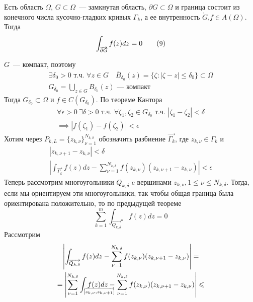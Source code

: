 \documentclass[main]{subfiles}
\begin{document}
\begin{theorem}
    Есть область $\Omega$, $G \subset \Omega$~--- замкнутая область, $\partial G \subset \Omega$ и граница состоит из конечного числа кусочно-гладких кривых $\Gamma_k$, а ее внутренность $\mathring{G}$,$f \in A(\Omega)$. Тогда
    \[\AnClOrInt[\AnClOrCurve[\partial G]] f(z) dz = 0 \tag{9}\]
\end{theorem}
\begin{longProof}
    $G$~--- компакт, поэтому
    \begin{gather*}
        \exists \delta_0 > 0 \text{ т.ч. } \forall z \in G\quad \overline{B}_{\delta_0}(z) = \{\zeta : |\zeta - z| \le \delta_0\} \subset \Omega\\
        G_{\delta_0} = \bigcup_{z \in G} B_{\delta_0} (z)\text{ --- компакт}
    \end{gather*}
    Тогда $G_{\delta_0} \subset \Omega$ и $f \in C (G_{\delta_0})$.
    По теореме Кантора
    \begin{multline*}
        \forall \epsilon >0\ \exists \delta > 0 \text{ т.ч. }\forall \zeta_1, \zeta_2 \in G_{\delta_0} \text{ т.ч. } |\zeta_1 - \zeta_2| < \delta \\
        \implies |f(\zeta_1) - f(\zeta_2)| < \epsilon \tag{10}
    \end{multline*}
    Хотим через $P_{k,L} = \{z_{k,\nu}\}_{\nu = 1}^{N_{k,\delta}}$ обозначить разбиение $\overrightarrow{\Gamma_k}$, где $z_{k,\nu} \in \Gamma_k$ и
    \begin{gather*}
        |z_{k, \nu+1} - z_{k, \nu}| < \delta \tag{11}\\
        \left| \int_{\overrightarrow{\Gamma_k}} f(z) dz - \sum_{\nu = 1}^{N_{k,\delta}} f(z_{k,\nu}) (z_{k, \nu + 1} - z_{k, \nu}) \right| < \epsilon \tag{12} %
    \end{gather*}
    Теперь рассмотрим многоугольники $Q_{k, \delta}$ c вершинами $z_{k, \nu}, 1 \le \nu \le N_{k, \delta}$.
    Тогда, если мы ориентируем эти многоугольники, так чтобы общая граница была ориентирована положительно, то по предыдущей теореме
    \[\sum_{k=1}^{m} \int_{\overrightarrow{Q_{k, \delta}}^\bullet} f(z) dz = 0 \tag{13}\]
    Рассмотрим
    \begin{multline*}
        \left| \int_{\overrightarrow{Q_{k, \delta}}} f(z) dz  - \sum_{\nu = 1}^{N_{k, \delta}} f(z_{k, \nu}) (z_{k, \nu + 1} - z_{k, \nu})\right| = \\
        = \left| \sum_{\nu = 1}^{N_{k, \delta}} \int_{\mathrlap{\overrightarrow{[z_{k, \nu}, z_{k, \nu + 1}]}}}\  f(z) dz - \sum_{\nu = 1}^{N_{k, \delta}} f(z_{k, \nu}) (z_{k, \nu + 1} - z_{k, \nu}) \right| \le \\

\end{multline*}
\end{longProof}
\end{document}
